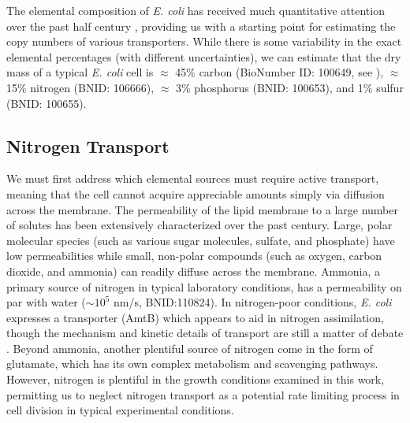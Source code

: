 The elemental composition of \textit{E. coli} has received much quantitative
attention over the past half century \citep{neidhardt1991, taymaz-nikerel2010,
heldal1985, bauer1976}, providing us with a starting point for estimating the
copy numbers of various transporters. While there is some variability in the
exact elemental percentages (with different uncertainties), we can estimate that
the dry mass of a typical \textit{E. coli} cell is $\approx$ 45\% carbon
(BioNumber ID: 100649, see ), $\approx$ 15\% nitrogen (BNID: 106666), $\approx$ 3\% phosphorus (BNID: 100653), and
1\% sulfur (BNID: 100655).

\subsection{Nitrogen Transport}
We must first address which elemental sources must require active
transport, meaning that the cell cannot acquire appreciable amounts simply
via diffusion across the membrane. The permeability of the lipid membrane to
a large number of solutes has been extensively characterized over the past
century. Large, polar molecular species (such as various sugar molecules,
sulfate, and phosphate) have low permeabilities while small, non-polar
compounds (such as oxygen, carbon dioxide, and ammonia) can readily diffuse
across the membrane. Ammonia, a primary source of nitrogen in typical
laboratory conditions, has a permeability on par with water ($\sim 10^5$
nm/s, BNID:110824). In nitrogen-poor conditions,
\textit{E. coli} expresses a transporter (AmtB) which appears to aid in
nitrogen assimilation, though the mechanism and kinetic details of transport
are still a matter of debate \citep{heeswijk2013a, khademi2004}. Beyond
ammonia, another plentiful source of nitrogen come in the form of glutamate,
which has its own complex metabolism and scavenging pathways. However,
nitrogen is plentiful in the growth conditions examined in this work,
permitting us to neglect nitrogen transport as a potential rate limiting
process in cell division in typical experimental conditions.

